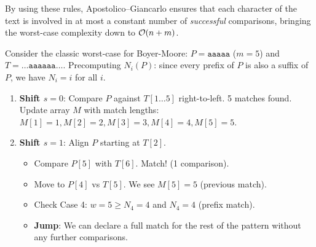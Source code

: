 By using these rules, Apostolico--Giancarlo ensures that each character of the text is involved in at most a constant number of \emph{successful} comparisons, bringing the worst-case complexity down to $\mathcal{O}\!\left(n+m\right)$.

\begin{example}
Consider the classic worst-case for Boyer-Moore: $P = \texttt{aaaaa}$ ($m=5$) and $T = \dots\texttt{aaaaaa}\dots$.
Precomputing $N_i(P)$: since every prefix of $P$ is also a suffix of $P$, we have $N_i = i$ for all $i$.

\begin{enumerate}
    \item \textbf{Shift $s=0$}: Compare $P$ against $T[1\dots 5]$ right-to-left. 5 matches found.
    Update array $M$ with match lengths: $M[1]=1, M[2]=2, M[3]=3, M[4]=4, M[5]=5$.
    
    \item \textbf{Shift $s=1$}: Align $P$ starting at $T[2]$.
    \begin{itemize}
        \item Compare $P[5]$ with $T[6]$. Match! (1 comparison).
        \item Move to $P[4]$ vs $T[5]$. We see $M[5] = 5$ (previous match).
        \item Check Case 4: $w=5 \ge N_4=4$ and $N_4=4$ (prefix match).
        \item \textbf{Jump}: We can declare a full match for the rest of the pattern without any further comparisons.
    \end{itemize}
\end{enumerate}

\begin{center}
\end{center}
\end{example}

